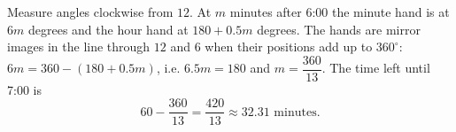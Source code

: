 Measure angles clockwise from $12$. At $m$ minutes after 6:00 the minute hand is at $6m$ degrees and the hour hand at $180+0.5m$ degrees. The hands are mirror images in the line through $12$ and $6$ when their positions add up to $360^\circ$: $6m=360-(180+0.5m)$, i.e. $6.5m=180$ and $m=\dfrac{360}{13}$. The time left until 7:00 is
\[60-\dfrac{360}{13}=\dfrac{420}{13}\approx\boxed{32.31}\text{ minutes}.\]
